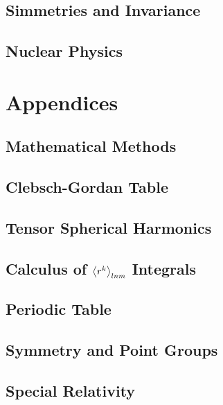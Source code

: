 \documentclass[a4paper, 11pt]{book}
\newcommand{\1}{\opr{\mathds{1}}}
\theoremstyle{definition}
\theoremstyle{remark}
\begin{document}
	\chapter{Simmetries and Invariance}
	
	\chapter{Nuclear Physics}
	
%		
\part{Appendices}
\appendix
	\chapter{Mathematical Methods}
		
	\chapter{Clebsch-Gordan Table}
		
	\chapter{Tensor Spherical Harmonics}\label{app:tsh}
		
	\chapter{Calculus of $\expval{r^k}_{lnm}$ Integrals}
		
	\chapter{Periodic Table}\label{app:E}
		
%		
	\chapter{Symmetry and Point Groups}\label{app:groups}
		
	\chapter{Special Relativity}
		
		
		
\nocite{quantistica,landau3,statistica,struttura,struttura1,griffmq,sakuraimqm,patritesta,molekulphysik,complessa,griffpart,nucleare,relativitat,relativita}
\printbibliography
\end{document}

